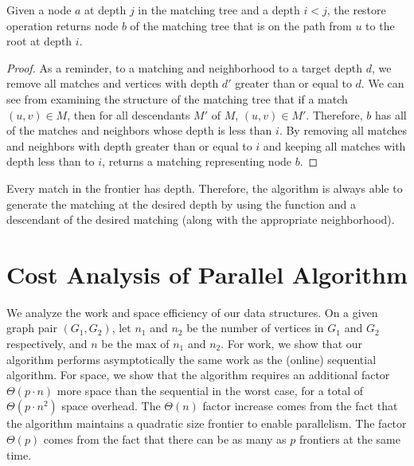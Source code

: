 \begin{theorem}
  Given a node $a$ at depth $j$ in the matching tree and a depth $i < j$,
  the restore operation returns node $b$ of the matching tree that
  is on the path from $u$ to the root at depth $i$.
\end{theorem}

\begin{proof}
  As a reminder, to  a matching and neighborhood to a target depth
  $d$, we remove all matches and vertices with depth $d'$ greater
  than or equal to $d$.
  We can see from examining the structure of the matching tree that
  if a match $(u, v) \in M$, then for all descendants $M'$ of $M$,
  $(u, v) \in M'$.
  Therefore, $b$ has all of the matches and neighbors whose depth
  is less than $i$.
  By removing all matches and neighbors with depth greater than or equal to $i$
  and keeping all matches with depth less than to $i$,
   returns a matching representing node $b$.
\end{proof}

Every match in the frontier has depth. Therefore, the algorithm is
always able to generate the matching at the desired depth by using the
 function and a descendant of the desired matching (along
with the appropriate neighborhood).
%


%
\section{Cost Analysis of Parallel Algorithm}
We analyze the work and space efficiency of our data structures.
%
On a given graph pair $(G_1, G_2)$, let $n_1$ and $n_2$ be the number of
vertices in $G_1$ and $G_2$ respectively, and $n$ be the max of $n_1$ and $n_2$.
%
For work, we show that our algorithm performs asymptotically the same
work as the (online) sequential algorithm.
%
%
For space, we show that
the algorithm requires an additional factor $\Theta(p\cdot n)$ more space
than the sequential in the worst case, for a total of $\Theta(p\cdot n^2)$ space overhead.
%
The $\Theta(n)$ factor increase
comes from the fact that the algorithm maintains a
quadratic size frontier to enable parallelism.
%
The factor $\Theta(p)$ comes from the fact that there can be as many
as $p$ frontiers at the same time.


